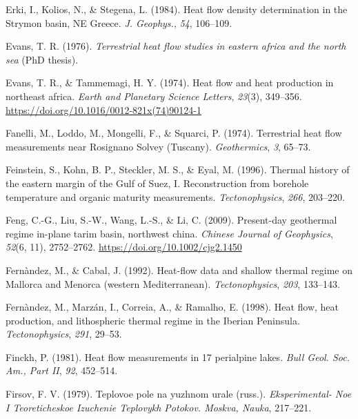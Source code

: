\begin{CSLReferences}{1}{1}
\leavevmode{}%
Erki, I., Kolios, N., \& Stegena, L. (1984). Heat flow density determination in the {Strymon} basin, {NE Greece}. \emph{J. Geophys.}, \emph{54}, 106--109.

\leavevmode{}%
Evans, T. R. (1976). \emph{Terrestrial heat flow studies in eastern africa and the north sea} (PhD thesis).

\leavevmode{}%
Evans, T. R., \& Tammemagi, H. Y. (1974). Heat flow and heat production in northeast africa. \emph{Earth and Planetary Science Letters}, \emph{23}(3), 349--356. \url{https://doi.org/10.1016/0012-821x(74)90124-1}

\leavevmode{}%
Fanelli, M., Loddo, M., Mongelli, F., \& Squarci, P. (1974). Terrestrial heat flow measurements near {Rosignano Solvey (Tuscany)}. \emph{Geothermics}, \emph{3}, 65--73.

\leavevmode{}%
Feinstein, S., Kohn, B. P., Steckler, M. S., \& Eyal, M. (1996). Thermal history of the eastern margin of the {Gulf of Suez, I}. Reconstruction from borehole temperature and organic maturity measurements. \emph{Tectonophysics}, \emph{266}, 203--220.

\leavevmode{}%
Feng, C.-G., Liu, S.-W., Wang, L.-S., \& Li, C. (2009). Present-day geothermal regime in-plane tarim basin, northwest china. \emph{Chinese Journal of Geophysics}, \emph{52}(6, 11), 2752--2762. \url{https://doi.org/10.1002/cjg2.1450}

\leavevmode{}%
Fernàndez, M., \& Cabal, J. (1992). Heat-flow data and shallow thermal regime on {Mallorca and Menorca} (western {Mediterranean}). \emph{Tectonophysics}, \emph{203}, 133--143.

\leavevmode{}%
Fernàndez, M., Marzán, I., Correia, A., \& Ramalho, E. (1998). Heat flow, heat production, and lithospheric thermal regime in the {Iberian Peninsula}. \emph{Tectonophysics}, \emph{291}, 29--53.

\leavevmode{}%
Finckh, P. (1981). Heat flow measurements in 17 perialpine lakes. \emph{Bull Geol. Soc. Am., Part II}, \emph{92}, 452--514.

\leavevmode{}%
Firsov, F. V. (1979). Teplovoe pole na yuzhnom urale (russ.). \emph{Eksperimental- Noe I Teoreticheskoe Izuchenie Teplovykh Potokov. Moskva, Nauka}, 217--221.


\end{CSLReferences}
